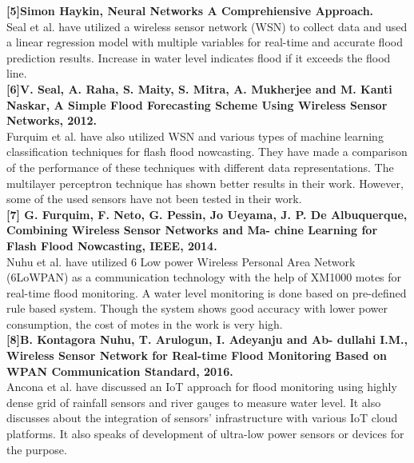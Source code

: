 \documentclass[a4paper,12pt]{report}
\begin{document}
\textbf{[5]Simon Haykin, Neural Networks A Comprehiensive
Approach.}\\ 
Seal et al. have utilized a wireless sensor network
(WSN) to collect data and used a linear regression model with
multiple variables for real-time and accurate flood prediction
results. Increase in water level indicates flood if it exceeds the
flood line. \\
\textbf{[6]V. Seal, A. Raha, S. Maity, S. Mitra, A. Mukherjee and
M. Kanti Naskar, A Simple Flood Forecasting Scheme
Using Wireless Sensor Networks, 2012.}\\
 Furquim et al. have also utilized WSN and various
types of machine learning classification techniques for flash
flood nowcasting. They have made a comparison of the
performance of these techniques with different data
representations. The multilayer perceptron technique has shown
better results in their work. However, some of the used sensors
have not been tested in their work.\\
\textbf{[7] G. Furquim, F. Neto, G. Pessin, Jo Ueyama, J. P. De
Albuquerque, Combining Wireless Sensor Networks and Ma-
chine Learning for Flash Flood Nowcasting, IEEE, 2014.}\\
Nuhu et al. have utilized 6 Low power Wireless Personal
Area Network (6LoWPAN) as a communication technology
with the help of XM1000 motes for real-time flood monitoring.
A water level monitoring is done based on pre-defined rule
based system. Though the system shows good accuracy with
lower power consumption, the cost of motes in the work is very
high. \\
\textbf{[8]B. Kontagora Nuhu, T. Arulogun, I. Adeyanju and Ab-
dullahi I.M., Wireless Sensor Network for Real-time
Flood Monitoring Based on WPAN Communication
Standard, 2016.}\\
 Ancona et al. have discussed an IoT approach for flood
monitoring using highly dense grid of rainfall sensors and river
gauges to measure water level. It also discusses about the
integration of sensors’ infrastructure with various IoT cloud
platforms. It also speaks of development of ultra-low power
sensors or devices for the purpose.\\
\end{document}
